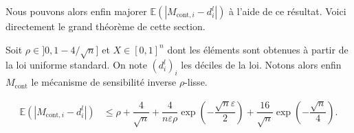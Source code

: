Nous pouvons alors enfin majorer \(\mathbb E (|M_{\text{cont}, i} - d_i^l|)\) à l'aide de ce résultat. Voici directement le grand théorème de cette section.

\begin{theorem}
    Soit \(\rho \in ]0, 1 - 4/\sqrt n]\) et \(X \in [0,1]^n\) dont les éléments sont obtenues à partir de la loi uniforme standard. On note \((d_i^l)_i\) les déciles de la loi. Notons alors enfin \(M_{\text{cont}}\) le mécanisme de sensibilité inverse \(\rho\)-lisse.

    \begin{align*}
        \mathbb E(|M_{\text{cont}, i} - d_i^l|) & \leq \rho + \dfrac{4}{\sqrt n} +\dfrac{4}{n\varepsilon\rho}\exp\left( -\dfrac{\sqrt n \varepsilon}{2} \right) + \dfrac{16}{\sqrt{n}}\exp\left( -\dfrac{\sqrt n }{4} \right).
    \end{align*}
\end{theorem}

